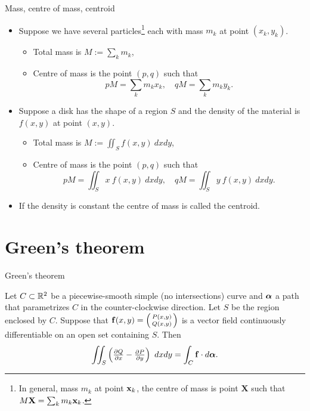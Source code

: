 {Mass, centre of mass, centroid}


\begin{itemize}
    \item Suppose we have several particles\footnote{In general, mass \(m_k\) at point \(\mathbf{x}_k\), the centre of mass is point \(\mathbf{X}\) such that \( M\mathbf{X} = \sum_{k} m_k \mathbf{x}_k\).} each with mass \(m_k\) at point \((x_k,y_k)\).
          \begin{itemize}
              \item Total mass is \(M := \sum_{k} m_k\),
              \item Centre of mass is the point \((p,q)\) such that
                    \[
                        p M = \sum_{k} m_k x_k,
                        \quad
                        q M = \sum_{k} m_k y_k.
                    \]
          \end{itemize}
    \item Suppose a disk has the shape of a region \(S\) and the density of the material is \(f(x,y)\) at point \((x,y)\).
          \begin{itemize}
              \item Total mass is \(M := \iint_{S} f(x,y) \ dxdy\),
              \item Centre of mass is the point \((p,q)\) such that
                    \[
                        p M = \iint_{S} x \ f(x,y) \ dxdy,
                        \quad
                        q M = \iint_{S} y \ f(x,y) \ dxdy.
                    \]
          \end{itemize}
    \item If the density is constant the centre of mass is called the centroid.
\end{itemize}




\section{Green's theorem}


 {Green's theorem}

\begin{theorem}
    Let \(C\subset\mathbb{R}^2\) be a piecewise-smooth simple (no intersections) curve and \(\boldsymbol{\alpha}\) a path that parametrizes \(C\) in the counter-clockwise direction.
    Let \(S\) be the region enclosed by \(C\).
    Suppose that \(\mathbf{f}(x,y) = \left(\begin{smallmatrix}
            P(x,y) \\ Q(x,y)
        \end{smallmatrix}\right)\) is a vector field continuously differentiable  on an open set containing \(S\).
    Then
    \[
        \iint_{S} \left(\tfrac{\partial Q}{\partial x} - \tfrac{\partial P}{\partial y}\right) \ dxdy = \int_{C} \mathbf{f} \cdot d\boldsymbol{\alpha}.
    \]
\end{theorem}





